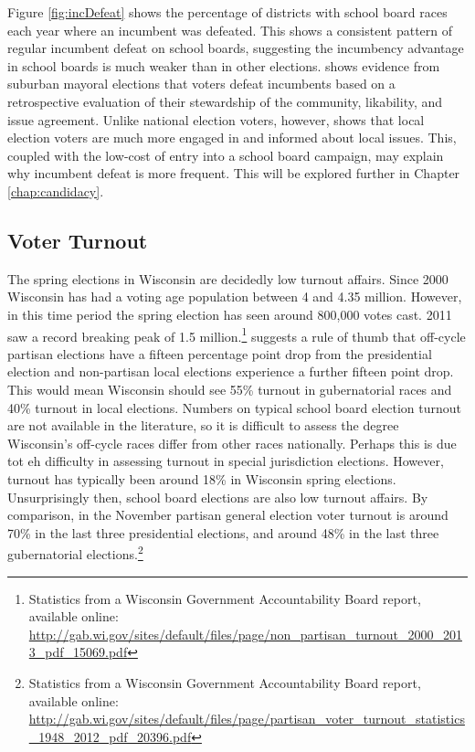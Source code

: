 Figure \ref{fig:incDefeat} shows the percentage of districts with school board 
races each year where an incumbent was defeated. This shows a consistent pattern 
of regular incumbent defeat on school boards, suggesting the incumbency advantage 
in school boards is much weaker than in other elections. \citet{oliver07} shows evidence 
from suburban mayoral elections that voters defeat incumbents based on a retrospective 
evaluation of their stewardship of the community, likability, and issue agreement. Unlike 
national election voters, however, \citet{oliver07} shows that local election voters are 
much more engaged in and informed about local issues. This, coupled with the low-cost 
of entry into a school board campaign, may explain why incumbent defeat is more 
frequent. This will be explored further in Chapter \ref{chap:candidacy}.

\subsection{Voter Turnout}
\label{subsec:turnout}

The spring elections in Wisconsin are decidedly low turnout affairs. Since 2000 
Wisconsin has had a voting age population between 4 and 4.35 million. However, 
in this time period the spring election has seen around 800,000 votes cast. 2011 saw 
a record breaking peak of 1.5 million.\footnote{Statistics from a Wisconsin Government Accountability 
Board report, available online: \url{http://gab.wi.gov/sites/default/files/page/non\_partisan\_turnout\_2000\_2013\_pdf\_15069.pdf}} \citet{teixeira92} suggests a 
rule of thumb that off-cycle partisan elections have a fifteen percentage point 
drop from the presidential election and non-partisan local elections experience a 
further fifteen point drop. This would mean Wisconsin should see 55\% turnout in 
gubernatorial races and 40\% turnout in local elections. Numbers on typical school 
board election turnout are not available in the literature, so it is difficult to 
assess the degree Wisconsin's off-cycle races differ from other races nationally. 
Perhaps this is due tot eh difficulty in assessing turnout in special jurisdiction 
elections. However, turnout has typically been around 18\% in Wisconsin spring elections. 
Unsurprisingly then, school board elections are also low turnout affairs. By comparison, 
in the November partisan general election voter turnout is around 70\% in the last 
three presidential elections, and around 48\% in the last three gubernatorial 
elections.\footnote{Statistics from a Wisconsin Government Accountability 
Board report, available online: \url{http://gab.wi.gov/sites/default/files/page/partisan\_voter_turnout\_statistics\_1948\_2012\_pdf\_20396.pdf}}

